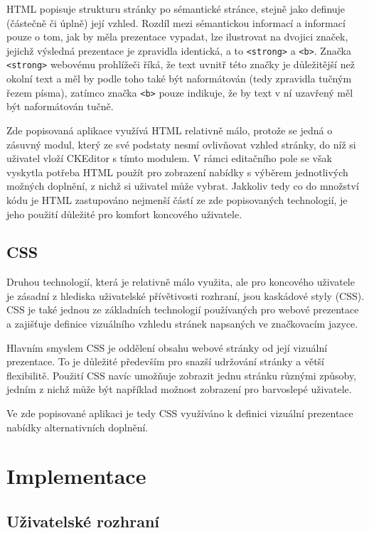 \documentclass[a4paper,11pt]{article}
\begin{document}
HTML popisuje strukturu stránky po sémantické stránce, stejně jako definuje (částečně či úplně) její vzhled. Rozdíl mezi sémantickou informací a informací pouze o tom, jak by měla prezentace vypadat, lze ilustrovat na dvojici značek, jejichž výsledná prezentace je zpravidla identická, a to {\tt <strong>} a {\tt <b>}. Značka {\tt <strong>} webovému prohlížeči říká, že text uvnitř této značky je důležitější než okolní text a měl by podle toho také být naformátován (tedy zpravidla tučným řezem písma), zatímco značka {\tt <b>} pouze indikuje, že by text v ní uzavřený měl být naformátován tučně. %


Zde popisovaná aplikace využívá HTML relativně málo, protože se jedná o zásuvný modul, který ze své podstaty nesmí ovlivňovat vzhled stránky, do níž si uživatel vloží CKEditor s tímto modulem. V rámci editačního pole se však vyskytla potřeba HTML použít pro zobrazení nabídky s výběrem jednotlivých možných doplnění, z nichž si uživatel může vybrat. Jakkoliv tedy co do množství kódu je HTML zastupováno nejmenší částí ze zde popisovaných technologií, je jeho použití důležité pro komfort koncového uživatele.

\subsection{CSS}

Druhou technologií, která je relativně málo využita, ale pro koncového uživatele je zásadní z hlediska uživatelské přívětivosti rozhraní, jsou kaskádové styly (CSS). CSS je také jednou ze základních technologií používaných pro webové prezentace a zajišťuje definice vizuálního vzhledu stránek napsaných ve značkovacím jazyce. \parencite{meyer2004cascading}

Hlavním smyslem CSS je oddělení obsahu webové stránky od její vizuální prezentace. To je důležité především pro snazší udržování stránky a větší flexibilitě. Použití CSS navíc umožňuje zobrazit jednu stránku různými způsoby, jedním z nichž může být například možnost zobrazení pro barvoslepé uživatele.

Ve zde popisované aplikaci je tedy CSS využíváno k definici vizuální prezentace nabídky alternativních doplnění.

\section{Implementace}

\subsection{Uživatelské rozhraní}\label{ui}
\end{document}
